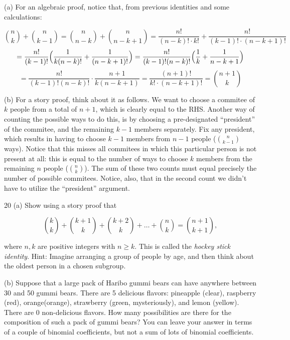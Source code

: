 \begin{solution}

    (a) For an algebraic proof, notice that, from previous identities and some calculations:

    \[\binom{n}{k} + \binom{n}{k - 1} = \binom{n}{n - k} + \binom{n}{n - k + 1} = \frac{n!}{(n - k)! \cdot k!} + \frac{n!}{(k - 1)! \cdot (n - k + 1)!}\]
    \[= \frac{n!}{(k - 1)!}\Bigl(\frac{1}{k(n - k)!} + \frac{1}{(n - k + 1)!}\Bigr) = \frac{n!}{(k - 1)!(n - k)!}\Bigl(\frac{1}{k} + \frac{1}{n - k + 1}\Bigr)\]
    \[= \frac{n!}{(k - 1)!(n - k )!}\cdot \frac{n + 1}{k(n - k + 1)} = \frac{(n + 1)!}{k!\cdot(n - k + 1)!} = \binom{n+1}{k}\]

    (b) For a story proof, think about it as follows.
    We want to choose a commitee of $k$ people from a total of $n + 1$, which is clearly equal to the RHS.
    Another way of counting the possible ways to do this, is by choosing a pre-designated ``president'' of the commitee, and the remaining $k - 1$ members separately.
    Fix any president, which results in having to choose $k - 1$ members from $n - 1$ people ($\binom{n}{k - 1}$ ways).
    Notice that this misses all commitees in which this particular person is not present at all: this is equal to the number of ways to choose $k$ members from the remaining $n$ people ($\binom{n}{k}$).
    The sum of these two counts must equal precisely the number of possible commitees.
    Notice, also, that in the second count we didn't have to utilize the ``president'' argument.
\end{solution}

\begin{exercise}{20}
    (a) Show using a story proof that

    \[\binom{k}{k} + \binom{k + 1}{k} + \binom{k + 2}{k} + \ldots + \binom{n}{k} = \binom{n + 1}{k + 1},\]

    where $n, k$ are positive integers with $n \geq k$.
    This is called the \textit{hockey stick identity}.
    Hint: Imagine arranging a group of people by age, and then think about the oldest person in a chosen subgroup.

    (b) Suppose that a large pack of Haribo gummi bears can have anywhere between 30 and 50 gummi bears.
    There are 5 delicious flavors: pineapple (clear), raspberry (red), orange(orange), strawberry (green, mysteriously), and lemon (yellow).
    There are 0 non-delicious flavors.
    How many possibilities are there for the composition of such a pack of gummi bears?
    You can leave your answer in terms of a couple of binomial coefficients, but not a sum of lots of binomial coefficients.
\end{exercise}

